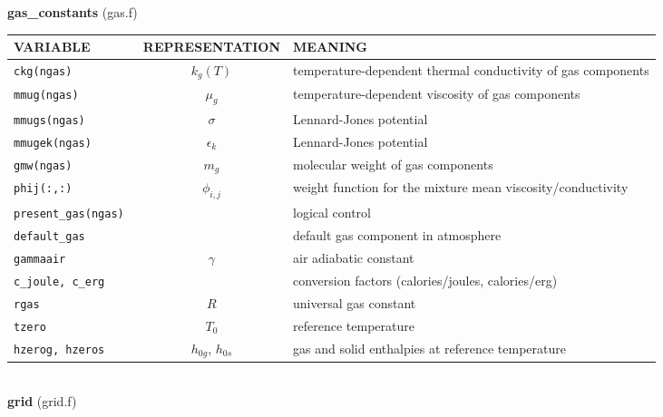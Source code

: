 %
%
{\large {\bf gas\_constants}} (gas.f)\\[5mm]
\begin{tabular}{|p{6cm}|c|p{6cm}|}\hline
VARIABLE & REPRESENTATION & MEANING\\\hline
\tt  ckg(ngas)    & $k_g(T)$ & temperature-dependent thermal conductivity of gas components\\\hline
\tt  mmug(ngas)   & $\mu_g$  & temperature-dependent viscosity of gas components\\\hline
\tt  mmugs(ngas)  & $\sigma$ & Lennard-Jones potential\\\hline
\tt  mmugek(ngas) & $\epsilon_k$ & Lennard-Jones potential\\\hline
\tt  gmw(ngas)    & $m_g$    & molecular weight of gas components\\\hline
\tt  phij(:,:)    & $\phi_{i,j}$ & weight function for the mixture mean viscosity/conductivity\\\hline
\tt  present\_gas(ngas)  & & logical control  \\\hline
\tt  default\_gas        & & default gas component in atmosphere \\\hline
\tt  gammaair         & $\gamma$ & air adiabatic constant \\\hline
\tt  c\_joule, c\_erg & & conversion factors (calories/joules, calories/erg) \\\hline
\tt  rgas             & $R$ & universal gas constant \\\hline
\tt  tzero            & $T_0$ & reference temperature \\\hline
\tt  hzerog, hzeros   &$h_{0g}$, $h_{0s}$& gas and solid enthalpies at reference temperature \\\hline
\end{tabular}\\[5mm]
%
%
{\large{\bf grid}} (grid.f)\\[5mm]

